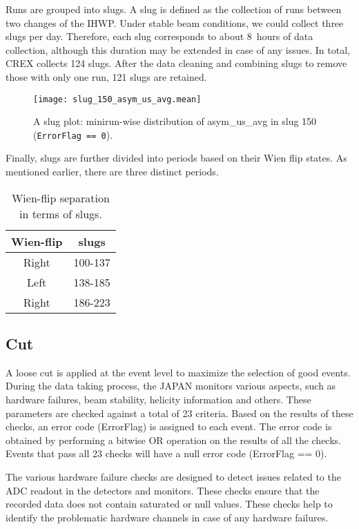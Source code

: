 Runs are grouped into slugs. A slug is defined as the collection of runs between two
changes of the IHWP. Under stable beam conditions, we could collect three slugs per day. 
Therefore, each slug corresponds to about 8~hours of data collection, although
this duration may be extended in case of any issues. In total, CREX collects
124 slugs. After the data cleaning and combining slugs to remove those with only one run, 
121 slugs are retained.
\begin{figure}[!h]
    \centering
    \texttt{[image: slug\_150\_asym\_us\_avg.mean]}
    \caption[A slug plot]
    {A slug plot: minirun-wise distribution of asym\_us\_avg in slug 150 
    (\texttt{ErrorFlag == 0}).}
\end{figure}

Finally, slugs are further divided into periods based on their Wien flip states. 
As mentioned earlier, there are three distinct periods.
\begin{table}[!h]
    \centering
    \begin{tabular}{c | c}
	\hline
	Wien-flip   & slugs \\
	\hline
	Right	& 100-137   \\
	Left	& 138-185   \\
	Right	& 186-223   \\
	\hline
    \end{tabular}
    \caption{Wien-flip separation in terms of slugs.}
\end{table}

\subsection{Cut}
A loose cut is applied at the event level to maximize the selection of good events.
During the data taking process, the JAPAN monitors various aspects, such as 
hardware failures, beam stability, helicity information and others. These parameters
are checked against a total of 23 criteria. Based on the results of these checks,
an error code (ErrorFlag) is assigned to each event. The error code is obtained 
by performing a bitwise OR operation on the results of all the checks. 
Events that pass all 23 checks will have a null error code (ErrorFlag == 0). 

The various hardware failure checks are designed to detect issues related to the
ADC readout in the detectors and monitors. These checks ensure that the recorded
data does not contain saturated or null values. These checks help to identify the problematic
hardware channels in case of any hardware failures.

